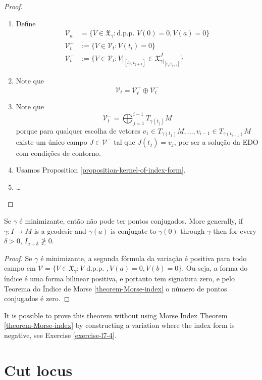 \begin{proof}
\begin{enumerate}
\item Define
\begin{align*}
\mathcal{V}_a&=\{V \in \mathfrak{X}_\gamma:\text{d.p.p. }V(0)=0, V(a)=0\}\\
\mathcal{V}_t^+&:=\{V \in \mathcal{V}_t:V(t_i)=0\}\\
\mathcal{V}_t^-& :=\{V \in \mathcal{V}_t:V|_{[t_j,t_{j+1}]}\in
\mathfrak{X}_{\gamma|_{[t_j,t_{j+1}]}}^J\}
\end{align*}
\item Note que
$$
\mathcal{V}_t=\mathcal{V}_t^+ \oplus  \mathcal{V}_t^-
$$
\item Note que 
$$
\mathcal{V}_t^-=\bigoplus_{j=1}^{i-1}T_{\gamma(t_j)}M
$$
porque para qualquer escolha de vetores
 $v_1 \in T_{\gamma(t_1)}M,\ldots,v_{i-1}\in T_{\gamma(t_{i-1})}M$ existe
 um único campo $J \in \mathcal{V}^-$ tal que $J(t_j)=v_j$, por ser a solução
 da EDO com condições de contorno.
\item Usamos Proposition \ref{proposition-kernel-of-index-form}.
\item …
\end{enumerate}
\end{proof}



\begin{theorem}
\label{theorem-Jacobi-theorem}
Se $\gamma$ é minimizante, então não pode ter pontos conjugados. More generally,
if $\gamma:I \to M$ is a geodesic and $ \gamma(a)$ is conjugate to $\gamma(0)$
through $\gamma$ then for every $\delta>0$, $I_{a+\delta}\not \geq 0$.
\end{theorem}

\begin{proof}
Se $\gamma$ é minimizante, a segunda fórmula da variação é positiva para todo
campo em $\mathcal{V}=\{V\in \mathfrak{X}_\gamma:V \text{ d.p.p. },
V(a)=0,V(b)=0\}$. Ou seja, a forma do índice é uma forma bilinear positiva, e
portanto tem signatura zero, e pelo Teorema do Índice de Morse 
\ref{theorem-Morse-index} o número de pontos conjugados é zero.
\end{proof}

It is possible to prove this theorem without using Morse Index Theorem
\ref{theorem-Morse-index} by constructing a variation where the index form is
negative, see Exercise \ref{exercise-l7-4}.

\section{Cut locus}
\label{section-cut-locus}

